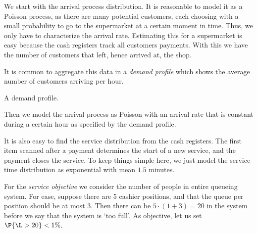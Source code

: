 We start with the arrival process distribution.
It is reasonable to model it as a Poisson process, as there are many potential customers, each choosing with a small probability to go to the supermarket at a certain moment in time.
Thus, we only have to characterize the arrival rate.
Estimating this for a supermarket is easy because the cash registers track all customers payments.
With this we have the number of customers that left, hence arrived at, the shop.

It is common to aggregate this data in a \emph{demand profile} which shows the average number of customers arriving per hour.
\begin{marginfigure}
\caption{A demand profile.}
\label{fig:loadprofile}
\end{marginfigure}
Then we model the arrival process as Poisson with an arrival rate that is constant during a certain hour as specified by the demand profile.



It is also easy to find the service distribution from the cash registers.
The first item scanned after a payment determines the start of a new service, and the payment closes the service.
To keep things simple here, we just model the service time distribution as exponential with mean $1.5$ minutes.

For the \emph{service objective} we consider the number of people in entire queueing system.
For ease, suppose there are 5 cashier positions, and that the queue per position should be at most 3.
Then there can be $5\cdot (1 + 3) = 20$ in the system before we say that the system is `too full'. As objective, let us set $\P{\L>20} < 1\%$.

